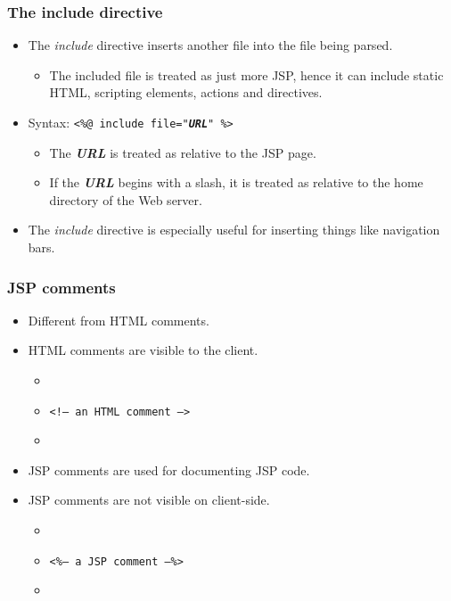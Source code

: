 \documentclass[10pt,xcolor=pdflatex]{beamer}
\begin{document}
\begin{frame}\frametitle{The include directive}
\begin{itemize}
	\item The \emph{include}\textbf{\textit{}} directive inserts another file into the file being parsed.
	  \begin{itemize}
		\item The included file is treated as just more JSP, hence it can include static HTML, scripting elements, actions and directives.
       \end{itemize}
	\item Syntax:  \texttt{<\%@ include file="\textbf{\textit{URL}}" \%>}
	  \begin{itemize}
    	\item The \emph{\textbf{\textit{URL}}} is treated as relative to the JSP page.
		\item If the \emph{\textbf{\textit{URL}}} begins with a slash, it is treated as relative to the home directory of the Web server.
      \end{itemize}
	\item The \emph{include} directive is especially useful for inserting things like navigation bars.
\end{itemize}
\end{frame}


\begin{frame}\frametitle{JSP comments}
	\begin{itemize}
    	\item Different from HTML comments.
		\item HTML comments are visible to the client.
          \begin{itemize}
        	\item[]
        	\item[] \texttt{<!-- an HTML comment -->}
            \item[]
          \end{itemize}
		\item JSP comments are used for documenting JSP code.
		\item JSP comments are not visible on client-side.
          \begin{itemize}
        	\item[]
        	\item[] \texttt{<\%-- a JSP comment --\%>}
            \item[]
          \end{itemize}        
    \end{itemize}
\end{frame}
\end{document}
